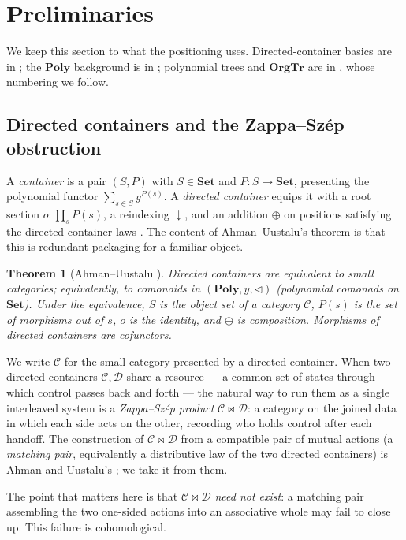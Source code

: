 \documentclass[11pt]{amsart}
\newtheorem{theorem}{Theorem}[section]
\theoremstyle{definition}
\theoremstyle{remark}
\newcommand{\Poly}{\mathbf{Poly}}
\newcommand{\Set}{\mathbf{Set}}
\newcommand{\OrgTr}{\mathbf{OrgTr}}
\newcommand{\C}{\mathcal{C}}
\newcommand{\D}{\mathcal{D}}
\newcommand{\seq}{\triangleleft}
\newcommand{\zs}{\bowtie}
\begin{document}
\section{Preliminaries}\label{sec:prelim}

We keep this section to what the positioning uses. Directed-container basics are in
\cite{AhmanUustalu}; the $\Poly$ background is in \cite{NiuSpivak}; polynomial trees and
$\OrgTr$ are in \cite{SpivakOrgTr}, whose numbering we follow.

\subsection{Directed containers and the Zappa--Szép obstruction}
A \emph{container} is a pair $(S,P)$ with $S\in\Set$ and $P\colon S\to\Set$, presenting
the polynomial functor $\sum_{s\in S}y^{P(s)}$. A \emph{directed container} equips it with
a root section $o\colon\prod_{s}P(s)$, a reindexing $\downarrow$, and an addition
$\oplus$ on positions satisfying the directed-container laws \cite[Def.~3.1]{AhmanUustalu}.
The content of Ahman--Uustalu's theorem is that this is redundant packaging for a familiar
object.

\begin{theorem}[Ahman--Uustalu \cite{AhmanUustalu}]\label{thm:AU}
Directed containers are equivalent to small categories; equivalently, to comonoids in
$(\Poly,y,\seq)$ (polynomial comonads on $\Set$). Under the equivalence, $S$ is the object
set of a category $\C$, $P(s)$ is the set of morphisms out of $s$, $o$ is the identity, and
$\oplus$ is composition. Morphisms of directed containers are cofunctors.
\end{theorem}

We write $\C$ for the small category presented by a directed container. When two directed
containers $\C,\D$ share a resource --- a common set of states through which control passes
back and forth --- the natural way to run them as a single interleaved system is a
\emph{Zappa--Szép product} $\C\zs\D$: a category on the joined data in which each side acts
on the other, recording who holds control after each handoff. The construction of $\C\zs\D$
from a compatible pair of mutual actions (a \emph{matching pair}, equivalently a
distributive law of the two directed containers) is Ahman and Uustalu's
\cite{AhmanUustaluDL}; we take it from them.

The point that matters here is that $\C\zs\D$ \emph{need not exist}: a matching pair
assembling the two one-sided actions into an associative whole may fail to close up. This
failure is cohomological.
\end{document}

